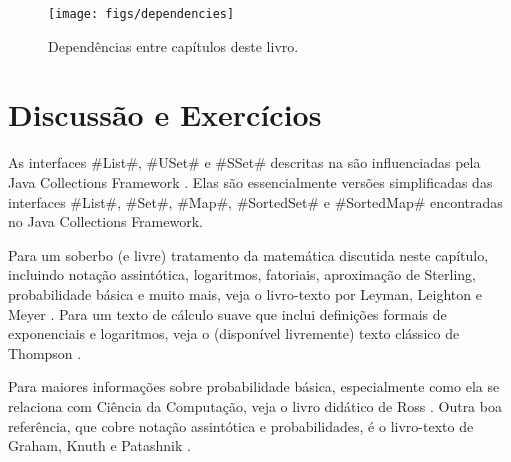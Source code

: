 \begin{figure}
  \begin{center}
    \texttt{[image: figs/dependencies]}
  \end{center}
  \caption{Dependências entre capítulos deste livro.}
\end{figure}

\section{Discussão e Exercícios}

As interfaces 
#List#, #USet# e #SSet# descritas na  são influenciadas pela Java Collections Framework
\cite{oracle_collections}.
%
Elas são essencialmente versões simplificadas das interfaces 
#List#, #Set#, #Map#, #SortedSet# e #SortedMap# encontradas no 
Java Collections Framework.  

Para um soberbo (e livre) tratamento da matemática discutida neste capítulo, incluindo notação assintótica, logaritmos, fatoriais, aproximação de Sterling, probabilidade básica e muito mais, veja o livro-texto por
Leyman, Leighton e Meyer \cite{llm11}.  
Para um texto de cálculo suave que inclui definições formais de exponenciais e logaritmos, veja o (disponível livremente) texto clássico de Thompson \cite{t14}.

Para maiores informações sobre probabilidade básica, especialmente como ela se relaciona com Ciência da Computação, veja o livro didático de Ross \cite{r01}.  
Outra boa referência, que cobre notação assintótica e probabilidades, é o livro-texto de Graham, Knuth e Patashnik \cite{gkp94}.


